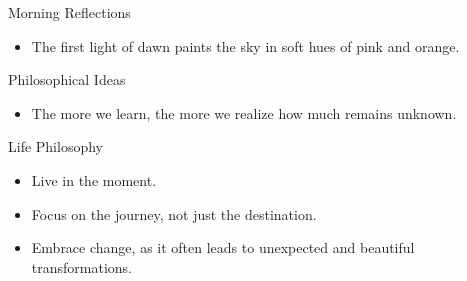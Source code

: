 \begin{skills}
    \skill
    {Morning Reflections}
    {
    \begin{itemize}
    \item {The first light of dawn paints the sky in soft hues of pink and orange.}
    \end{itemize}
    }
    \skill
    {Philosophical Ideas}
    {
    \begin{itemize}
    \item {The more we learn, the more we realize how much remains unknown.}
    \end{itemize}
    }
    \skill
    {Life Philosophy}
    {
    \begin{itemize}
    \item {Live in the moment.}
    \item {Focus on the journey, not just the destination.}
    \item {Embrace change, as it often leads to unexpected and beautiful transformations.}
    \end{itemize}
    }
\end{skills}
